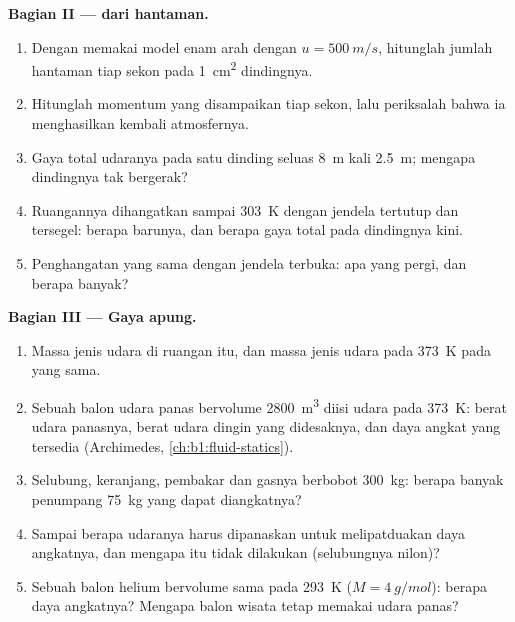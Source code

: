 \begin{problem}
\medskip
\noindent\textbf{Bagian II ---  dari hantaman.}
\begin{enumerate}[resume]
  \item Dengan memakai model enam arah dengan $u = \qty{500}{m/s}$, hitunglah
        jumlah hantaman tiap sekon pada \qty{1}{cm^2} dindingnya.
  \item Hitunglah momentum yang disampaikan tiap sekon, lalu periksalah bahwa ia
        menghasilkan kembali  atmosfernya.
  \item Gaya total udaranya pada satu dinding seluas \qty{8}{m} kali \qty{2.5}{m};
        mengapa dindingnya tak bergerak?
  \item Ruangannya dihangatkan sampai \qty{303}{K} dengan jendela tertutup dan
        tersegel: berapa  barunya, dan berapa gaya total pada dindingnya kini.
  \item Penghangatan yang sama dengan jendela terbuka: apa yang pergi, dan berapa banyak?
\end{enumerate}

\medskip
\noindent\textbf{Bagian III --- Gaya apung.}
\begin{enumerate}[resume]
  \item Massa jenis udara di ruangan itu, dan massa jenis udara pada \qty{373}{K} pada
         yang sama.
  \item Sebuah balon udara panas bervolume \qty{2800}{m^3} diisi udara pada
        \qty{373}{K}: berat udara panasnya, berat udara dingin yang
        didesaknya, dan daya angkat yang tersedia (Archimedes,
        \cref{ch:b1:fluid-statics}).
  \item Selubung, keranjang, pembakar dan gasnya berbobot \qty{300}{kg}: berapa banyak
        penumpang \qty{75}{kg} yang dapat diangkatnya?
  \item Sampai  berapa udaranya harus dipanaskan untuk melipatduakan daya angkatnya,
        dan mengapa itu tidak dilakukan (selubungnya nilon)?
  \item Sebuah balon helium bervolume sama pada \qty{293}{K}
        ($M = \qty{4}{g/mol}$): berapa daya angkatnya? Mengapa balon wisata tetap
        memakai udara panas?
\end{enumerate}


\end{problem}
